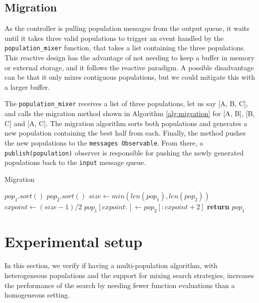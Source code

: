 \subsection{Migration}
\label{migration}

As the controller is pulling population messages from the output queue, it waits
until it takes three valid populations to trigger an event handled by the
\texttt{population\_mixer}  function, that takes a list containing the three
populations. This reactive design has the advantage of not needing to keep a
buffer in memory or external storage, and it follows the reactive paradigm. A
possible disadvantage can be that it only mixes contiguous populations, but we
could mitigate this with a larger buffer.

The \texttt{population\_mixer} receives a list of three populations, let us say
[A, B, C], and calls the migration method shown in Algorithm \ref{alg:migration}
for [A, B], [B, C] and [A, C]. The migration algorithm sorts both populations
and generates a new population containing the best half from each. Finally, the
method pushes the new populations to the \texttt{messages Observable}. From
there, a \texttt{publish(population)} observer is responsible for pushing the
newly generated populations back to the \texttt{input} message queue.

\begin{algorithm}
    \caption{Migration}
    \label{alg:migration}
    \begin{algorithmic}[1]
            \State $pop_1.sort()$
            \State $pop_2.sort()$
            \State $size\gets min(len(pop_1), len(pop_2))$
            \State $cxpoint\gets (size-1)/2$
            \State $pop_1[cxpoint:]\gets pop_2[:cxpoint+2]$
            \State \textbf{return} $pop_1$
        \EndProcedure 
    \end{algorithmic}
\end{algorithm}

\section{Experimental setup}
\label{setup}

In this section, we verify if having a multi-population algorithm, with
heterogeneous populations and the support for mixing search strategies,
increases the performance of the search by needing fewer function evaluations
than a homogeneous setting.

